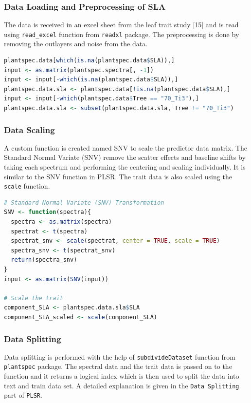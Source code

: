 \documentclass[12pt,a4paper]{report}
\begin{document}
\subsubsection*{Data Loading and Preprocessing of SLA}
The data is received in an excel sheet from the leaf trait study [15] and is read using \texttt{read\_excel} function from \texttt{readxl} package. The preprocessing is done by removing the outlayers and noise from the data.\\

\begin{lstlisting}[language=R, style=mystyle]
plantspec.data[which(is.na(plantspec.data$SLA)),]
input <- as.matrix(plantspec.spectra[, -1])
input <- input[-which(is.na(plantspec.data$SLA)),]
plantspec.data.sla <- plantspec.data[!is.na(plantspec.data$SLA),]
input <- input[-which(plantspec.data$Tree == "70_Ti3"),]
plantspec.data.sla <- subset(plantspec.data.sla, Tree != "70_Ti3")
\end{lstlisting}

\subsubsection*{Data Scaling}
A custom function is created named SNV to scale the predictor data matrix. The Standard Normal Variate (SNV) remove the scatter effects and baseline shifts by taking each spectrum and performing the centering and scaling individually. It is similar to the SNV function in PLSR. The trait data is also scaled using the \texttt{scale} function.\\

\begin{lstlisting}[language=R, style=mystyle]
# Standard Normal Variate (SNV) Transformation
SNV <- function(spectra){
  spectra <- as.matrix(spectra)
  spectrat <- t(spectra)
  spectrat_snv <- scale(spectrat, center = TRUE, scale = TRUE)
  spectra_snv <- t(spectrat_snv)
  return(spectra_snv)
}
input <- as.matrix(SNV(input))

# Scale the trait
component_SLA <- plantspec.data.sla$SLA
component_SLA_scaled <- scale(component_SLA)
\end{lstlisting}

\subsubsection*{Data Splitting}
Data splitting is performed with the help of \texttt{subdivideDataset} function from \texttt{plantspec} package. The spectral data and the trait data is passed on to the function and it returns a logical index which is then used to split the data into text and train data set. A detailed explanation is given in the \texttt{Data Splitting} part of \texttt{PLSR}. \\
\end{document}
